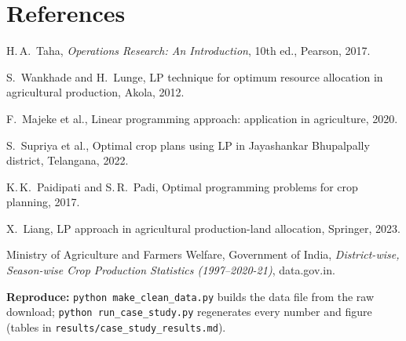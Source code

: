 \documentclass[11pt,a4paper]{article}
\begin{document}
\section*{References}
\begin{enumerate}[label={[\arabic*]}]
  \item H.\,A.\ Taha, \emph{Operations Research: An Introduction}, 10th ed., Pearson, 2017.
  \item S.\ Wankhade and H.\ Lunge, LP technique for optimum resource allocation in agricultural production, Akola, 2012.
  \item F.\ Majeke et al., Linear programming approach: application in agriculture, 2020.
  \item S.\ Supriya et al., Optimal crop plans using LP in Jayashankar Bhupalpally district, Telangana, 2022.
  \item K.\,K.\ Paidipati and S.\,R.\ Padi, Optimal programming problems for crop planning, 2017.
  \item X.\ Liang, LP approach in agricultural production-land allocation, Springer, 2023.
  \item Ministry of Agriculture and Farmers Welfare, Government of India,
        \emph{District-wise, Season-wise Crop Production Statistics (1997--2020-21)}, data.gov.in.
\end{enumerate}

{\sloppy\textbf{Reproduce:} \texttt{python make\_clean\_data.py} builds the data file from the raw download;
\texttt{python run\_case\_study.py} regenerates every number and figure (tables in
\texttt{results/case\_study\_results.md}).\par}
\end{document}
